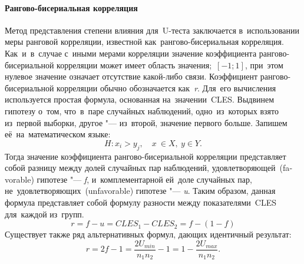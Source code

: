 \documentclass[]{scrartcl}
\begin{document}
\paragraph{Рангово-бисериальная корреляция}
Метод представления степени влияния для~U-теста заключается в~использовании меры ранговой корреляции, известной как~рангово-бисериальная корреляция. Как~и~в~случае с~иными мерами корреляции значение коэффициента рангово-бисериальной корреляции может имеет область значения;~${\textstyle [-1;1]}$, при~этом нулевое значение означает отсутствие какой-либо связи. Коэффициент рангово-бисериальной корреляции обычно обозначается как~\textit{r}. Для~его вычисления используется простая формула, основанная на~значении~CLES. Выдвинем гипотезу о~том, что~в~паре случайных наблюдений, одно~из~которых взято из~первой выборки, другое "--- из~второй, значение первого больше. Запишем её~на~математическом языке:
\begin{equation}\label{eq:RBC-hypothesis}
H: x_{i} > y_{j}, \quad x \ \in X,\ y \in Y.
\end{equation} 
Тогда значение коэффициента рангово-бисериальной корреляции представляет собой разницу между долей случайных пар наблюдений, удовлетворяющей~(\foreignlanguage{english}{favorable}) гипотезе "--- \textit{f}, и~комплементарной ей~доле случайных пар, не~удовлетворяющих~(\foreignlanguage{english}{unfavorable}) гипотезе "--- \textit{u}. Таким образом, данная формула представляет собой формулу разности между показателями~CLES для~каждой из~групп.
\begin{equation}\label{eq:RBC-formula-1}
r = f - u = CLES_{1} - CLES_{2} = f - (1 - f)
\end{equation}
Существует также ряд альтернативных формул, дающих идентичный результат:
\begin{equation}\label{eq:RBC-formula-2}
r = 2f -1 = \frac{2U_{min}}{n_{1}n_{2}}-1 = 1 - \frac{2U_{max}}{n_{1}n_{2}}.
\end{equation}	
\end{document}
